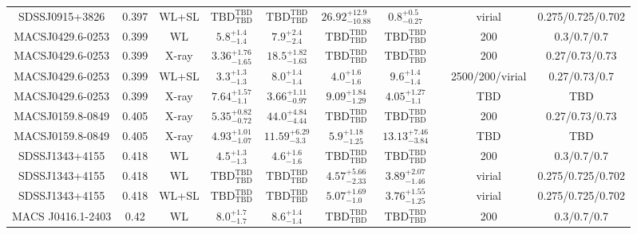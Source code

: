 \begin{table}
\begin{tabular}{cccccccccc}
SDSSJ0915+3826 & 0.397 & WL+SL & ${\mathrm{TBD}}^{\mathrm{TBD}}_{\mathrm{TBD}}$ & ${\mathrm{TBD}}^{\mathrm{TBD}}_{\mathrm{TBD}}$ & ${26.92}^{+12.9}_{-10.88}$ & ${0.8}^{+0.5}_{-0.27}$ & \citet{OG12.1} & virial & 0.275/0.725/0.702 \\
MACSJ0429.6-0253 & 0.399 & WL & ${5.8}^{+1.4}_{-1.4}$ & ${7.9}^{+2.4}_{-2.4}$ & ${\mathrm{TBD}}^{\mathrm{TBD}}_{\mathrm{TBD}}$ & ${\mathrm{TBD}}^{\mathrm{TBD}}_{\mathrm{TBD}}$ & \citet{SE14.1} & 200 & 0.3/0.7/0.7 \\
MACSJ0429.6-0253 & 0.399 & X-ray & ${3.36}^{+1.76}_{-1.65}$ & ${18.5}^{+1.82}_{-1.63}$ & ${\mathrm{TBD}}^{\mathrm{TBD}}_{\mathrm{TBD}}$ & ${\mathrm{TBD}}^{\mathrm{TBD}}_{\mathrm{TBD}}$ & \citet{BA14.1} & 200 & 0.27/0.73/0.73 \\
MACSJ0429.6-0253 & 0.399 & WL+SL & ${3.3}^{+1.3}_{-1.3}$ & ${8.0}^{+1.4}_{-1.4}$ & ${4.0}^{+1.6}_{-1.6}$ & ${9.6}^{+1.4}_{-1.4}$ & \citet{ME14.1} & 2500/200/virial & 0.27/0.73/0.7 \\
MACSJ0429.6-0253 & 0.399 & X-ray & ${7.64}^{+1.57}_{-1.1}$ & ${3.66}^{+1.11}_{-0.97}$ & ${9.09}^{+1.84}_{-1.29}$ & ${4.05}^{+1.27}_{-1.1}$ & \citet{SC06.1} & TBD & TBD \\
MACSJ0159.8-0849 & 0.405 & X-ray & ${5.35}^{+0.82}_{-0.72}$ & ${44.0}^{+4.84}_{-4.44}$ & ${\mathrm{TBD}}^{\mathrm{TBD}}_{\mathrm{TBD}}$ & ${\mathrm{TBD}}^{\mathrm{TBD}}_{\mathrm{TBD}}$ & \citet{BA14.1} & 200 & 0.27/0.73/0.73 \\
MACSJ0159.8-0849 & 0.405 & X-ray & ${4.93}^{+1.01}_{-1.07}$ & ${11.59}^{+6.29}_{-3.3}$ & ${5.9}^{+1.18}_{-1.25}$ & ${13.13}^{+7.46}_{-3.84}$ & \citet{SC06.1} & TBD & TBD \\
SDSSJ1343+4155 & 0.418 & WL & ${4.5}^{+1.3}_{-1.3}$ & ${4.6}^{+1.6}_{-1.6}$ & ${\mathrm{TBD}}^{\mathrm{TBD}}_{\mathrm{TBD}}$ & ${\mathrm{TBD}}^{\mathrm{TBD}}_{\mathrm{TBD}}$ & \citet{SE14.1} & 200 & 0.3/0.7/0.7 \\
SDSSJ1343+4155 & 0.418 & WL & ${\mathrm{TBD}}^{\mathrm{TBD}}_{\mathrm{TBD}}$ & ${\mathrm{TBD}}^{\mathrm{TBD}}_{\mathrm{TBD}}$ & ${4.57}^{+5.66}_{-2.33}$ & ${3.89}^{+2.07}_{-1.46}$ & \citet{OG12.1} & virial & 0.275/0.725/0.702 \\
SDSSJ1343+4155 & 0.418 & WL+SL & ${\mathrm{TBD}}^{\mathrm{TBD}}_{\mathrm{TBD}}$ & ${\mathrm{TBD}}^{\mathrm{TBD}}_{\mathrm{TBD}}$ & ${5.07}^{+1.69}_{-1.0}$ & ${3.76}^{+1.55}_{-1.25}$ & \citet{OG12.1} & virial & 0.275/0.725/0.702 \\
MACS J0416.1-2403 & 0.42 & WL & ${8.0}^{+1.7}_{-1.7}$ & ${8.6}^{+1.4}_{-1.4}$ & ${\mathrm{TBD}}^{\mathrm{TBD}}_{\mathrm{TBD}}$ & ${\mathrm{TBD}}^{\mathrm{TBD}}_{\mathrm{TBD}}$ & \citet{SE14.1} & 200 & 0.3/0.7/0.7 \\

\end{tabular}
\end{table}
